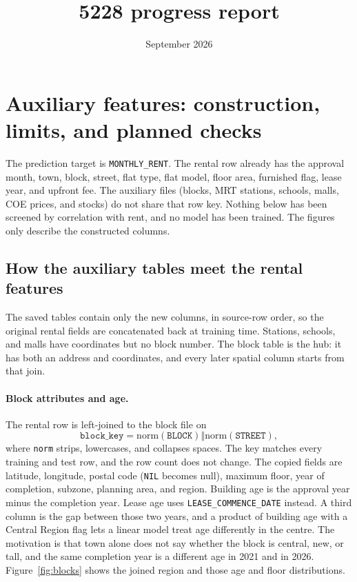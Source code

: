 \documentclass[11pt]{article}
\title{5228 progress report}
\date{September 2026}
\begin{document}
\maketitle

\section{Auxiliary features: construction, limits, and planned checks}
\label{sec:auxiliary}

The prediction target is \texttt{MONTHLY\_RENT}.
The rental row already has the approval month, town, block, street, flat type, flat model, floor area, furnished flag, lease year, and upfront fee.
The auxiliary files (blocks, MRT stations, schools, malls, COE prices, and stocks) do not share that row key.
Nothing below has been screened by correlation with rent, and no model has been trained.
The figures only describe the constructed columns.

\subsection{How the auxiliary tables meet the rental features}

The saved tables contain only the new columns, in source-row order, so the original rental fields are concatenated back at training time.
Stations, schools, and malls have coordinates but no block number.
The block table is the hub: it has both an address and coordinates, and every later spatial column starts from that join.

\paragraph{Block attributes and age.}
The rental row is left-joined to the block file on
\begin{equation}
\texttt{block\_key}
=
\mathrm{norm}(\texttt{BLOCK})
\mathbin{\Vert}
\mathrm{norm}(\texttt{STREET}),
\end{equation}
where \texttt{norm} strips, lowercases, and collapses spaces.
The key matches every training and test row, and the row count does not change.
The copied fields are latitude, longitude, postal code (\texttt{NIL} becomes null), maximum floor, year of completion, subzone, planning area, and region.
Building age is the approval year minus the completion year.
Lease age uses \texttt{LEASE\_COMMENCE\_DATE} instead.
A third column is the gap between those two years, and a product of building age with a Central Region flag lets a linear model treat age differently in the centre.
The motivation is that town alone does not say whether the block is central, new, or tall, and the same completion year is a different age in 2021 and in 2026.
Figure~\ref{fig:blocks} shows the joined region and those age and floor distributions.
\end{document}
